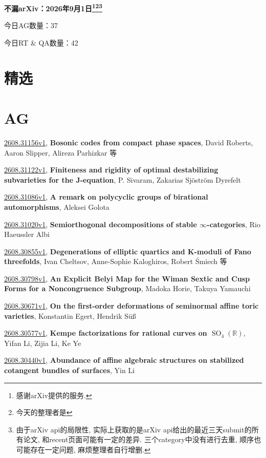 \documentclass[9pt, a4paper]{article}
\theoremstyle{plain}
\theoremstyle{definition}
\theoremstyle{remark}
\newcommand{\arxiv}[3]{\href{https://arxiv.org/abs/#1}{#1}, \textbf{\textcolor{arxivblue}{#2}}, #3}
\newcommand{\AGnumber}{37}
\newcommand{\RTQAnumber}{42}
\newcommand{\NewestDate}{2026年9月1日}
\newcommand{\todayarXiver}{} %
\begin{document}
\begin{center}
    \Huge\textbf{不漏arXiv：\NewestDate\footnote{感谢arXiv提供的服务.}\footnote{今天的整理者是\todayarXiver}\footnote{由于arXiv api的局限性, 实际上获取的是arXiv api给出的最近三天submit的所有论文, 和recent页面可能有一定的差异. 三个category中没有进行去重, 顺序也可能存在一定问题, 麻烦整理者自行增删.}} \\
\end{center}

\setcounter{section}{-1}

\begin{center}
    今日AG数量：\AGnumber
    
    今日RT \& QA数量：\RTQAnumber
    
\end{center}


\section{精选}


\section{AG}
\arxiv{2608.31156v1}{Bosonic codes from compact phase spaces}{David Roberts, Aaron Slipper, Alireza Parhizkar 等}

\arxiv{2608.31122v1}{Finiteness and rigidity of optimal destabilizing subvarieties for the J-equation}{P. Sivaram, Zakarias Sjöström Dyrefelt}

\arxiv{2608.31086v1}{A remark on polycyclic groups of birational automorphisms}{Aleksei Golota}

\arxiv{2608.31020v1}{Semiorthogonal decompositions of stable $\infty$-categories}{Rio Haeussler Albi}

\arxiv{2608.30855v1}{Degenerations of elliptic quartics and K-moduli of Fano threefolds}{Ivan Cheltsov, Anne-Sophie Kaloghiros, Robert Śmiech 等}

\arxiv{2608.30798v1}{An Explicit Belyi Map for the Wiman Sextic and Cusp Forms for a Noncongruence Subgroup}{Madoka Horie, Takuya Yamauchi}

\arxiv{2608.30671v1}{On the first-order deformations of seminormal affine toric varieties}{Konstantin Egert, Hendrik Süß}

\arxiv{2608.30577v1}{Kempe factorizations for rational curves on $\operatorname{SO}_4(\mathbb{R})$}{Yifan Li, Zijia Li, Ke Ye}

\arxiv{2608.30440v1}{Abundance of affine algebraic structures on stabilized cotangent bundles of surfaces}{Yin Li}
\end{document}
